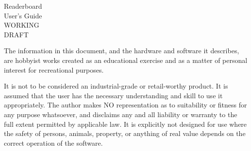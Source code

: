 
\frontmatter
{}
\newcommand\api{\acronym{API}}
\newcommand\pc{\acronym{PC}}
\newcommand\cli{\acronym{CLI}}
\newcommand\ascii{\acronym{ASCII}}
\newcommand\led{\acronym{LED}}
\newcommand\codetype[1]{\z{#1}}
\newcommand\ixz[1]{\index{#1@\z{#1}}\z{#1}}
\newcommand\tUnused{\cellcolor{gray!50}}
\newcommand\tControl{\cellcolor{yellow!50}}
\newcommand\tForbidden{\cellcolor{red!50}}
\newcommand\tSpecial{\cellcolor{blue!25}}
\thispagestyle{empty}
	\begin{center}
		\Huge Readerboard \\ User's Guide \\
		WORKING\\DRAFT
	\end{center}

\vfill
\newpage
The information in this document, and the hardware and software it describes, are hobbyist
works created as an educational exercise and as a matter of personal interest for recreational
purposes.

It is not to be considered an industrial-grade or retail-worthy product.
It is assumed that the user has the necessary understanding and skill to use it appropriately.  The author makes NO
representation as to suitability or fitness for any purpose whatsoever, and disclaims any and all liability or 
warranty to the full extent permitted by applicable law.  It is explicitly not designed for use where the safety
of persons, animals, property, or anything of real value depends on the correct operation of the software.

\strut\vfill


